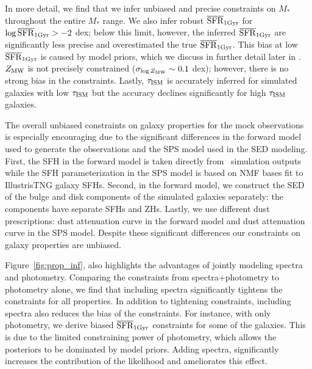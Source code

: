 In more detail, we find that we infer unbiased and precise constraints on
$M_*$ throughout the entire $M_*$ range. 
We also infer robust $\overline{\rm SFR}_{\rm 1Gyr}$ for $\log \overline{\rm SFR}_{\rm 1Gyr} > -2$ dex; below this limit,
however, the inferred $\overline{\rm SFR}_{\rm 1Gyr}$ are significantly less precise and
overestimated the true $\overline{\rm SFR}_{\rm 1Gyr}$. 
This bias at low $\overline{\rm SFR}_{\rm 1Gyr}$ is caused by model priors, which we discuss in
further detail later in . 
$Z_{\rm MW}$ is not precisely constrained ($\sigma_{\log Z_{\rm MW}} \sim 0.1$
dex); however, there is no strong bias in the constraints. 
Lastly, $\tau_{\rm ISM}$ is accurately inferred for simulated galaxies with
low $\tau_{\rm ISM}$ but the accuracy declines significantly for high 
$\tau_{\rm ISM}$ galaxies. 

The overall unbiased constraints on galaxy properties for the mock observations
is especially encouraging due to the significant differences in the forward
model used to generate the observations and the SPS model used in the SED
modeling. 
First, the SFH in the forward model is taken directly from \lgal~simulation
outputs while the SFH parameterization in the SPS model is based on NMF bases fit
to IllustrisTNG galaxy SFHs.
Second, in the forward model, we construct the SED of the bulge and disk
components of the simulated galaxies separately: the components have separate
SFHs and ZHs. 
Lastly, we use different dust prescriptions: \cite{mathis1983} dust attenuation  
curve in the forward model and \cite{kriek2013} dust attenuation curve in the
SPS model. 
Despite these significant differences our constraints on galaxy properties are
unbiased. 

Figure~\ref{fig:prop_inf}, also highlights the advantages of jointly modeling
spectra and photometry. 
Comparing the constraints from spectra+photometry to photometry alone, we find
that including spectra significantly tightens the constraints for all
properties. 
In addition to tightening constraints, including spectra also reduces the bias
of the constraints. 
For instance, with only photometry, we derive biased $\overline{\rm SFR}_{\rm 1Gyr}$ constraints for
some of the galaxies. 
This is due to the limited constraining power of photometry, which allows the
posteriors to be dominated by model priors. 
Adding spectra, significantly increases the contribution of the likelihood and
ameliorates this effect. 

